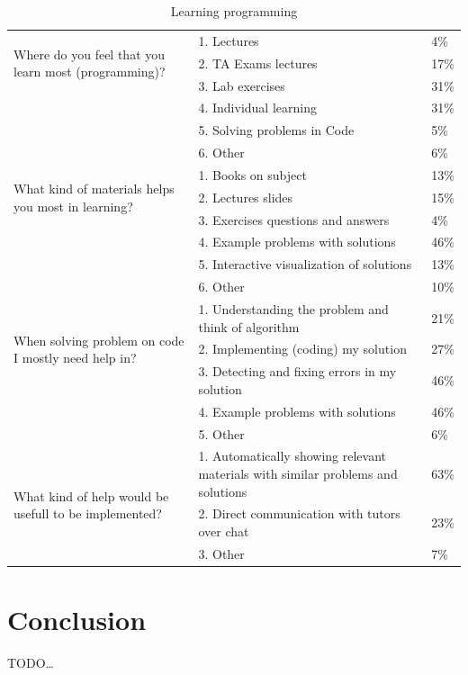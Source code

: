 \documentclass{llncs}
\begin{document}
\begin{table}
\caption{Learning programming}
\begin{center}
\begin{tabular}{ |p{4cm}|p{7cm}|l| }
\hline
\multirow{3}{4cm}{Where do you feel that you learn most (programming)?} &
1. Lectures & 4\%\\
\cline{2-3}
 & 2. TA Exams lectures & 17\% \\
 \cline{2-3}
 & 3. Lab exercises & 31\% \\
 \cline{2-3}
 & 4. Individual learning & 31\% \\
 \cline{2-3}
 & 5. Solving problems in Code & 5\% \\
 \cline{2-3}
 & 6. Other & 6\%\\
\hline
\multirow{3}{4cm}{What kind of materials helps you most in learning?} &
1. Books on subject & 13\%\\
\cline{2-3}
 & 2. Lectures slides & 15\% \\
\cline{2-3}
 & 3. Exercises questions and answers & 4\% \\
\cline{2-3} 
 & 4. Example problems with solutions & 46\% \\
 \cline{2-3}
 & 5. Interactive visualization of solutions & 13\% \\
 \cline{2-3}
 & 6. Other & 10\%\\
\hline
\multirow{3}{4cm}{When solving problem on code I mostly need help in?} &
1. Understanding the problem and think of algorithm & 21\%\\
\cline{2-3}
 & 2. Implementing (coding) my solution & 27\% \\
 \cline{2-3}
 & 3. Detecting and fixing errors in my solution & 46\% \\
 \cline{2-3}
 & 4. Example problems with solutions & 46\% \\
 \cline{2-3}
 & 5. Other & 6\%\\
\hline
\multirow{3}{4cm}{What kind of help would be usefull to be implemented?} &
1. Automatically showing relevant materials with similar problems and solutions
& 63\%\\
\cline{2-3}
 & 2. Direct communication with tutors over chat & 23\% \\
 \cline{2-3}
 & 3. Other & 7\%\\
\hline
\end{tabular}
\label{table:learning_programming}
\end{center}
\end{table}


\section{Conclusion}

TODO\ldots




\end{document}
